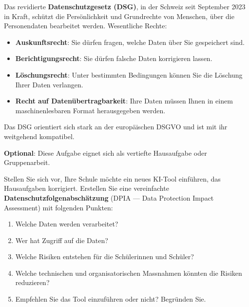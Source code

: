 \begin{myexcursion}
Das revidierte \textbf{Datenschutzgesetz (DSG)}, in der Schweiz seit September 2023
in Kraft, schützt die Persönlichkeit und Grundrechte von Menschen,
über die Personendaten bearbeitet werden. Wesentliche Rechte:

\begin{itemize}
    \item \textbf{Auskunftsrecht}: Sie dürfen fragen, welche Daten über Sie
          gespeichert sind.
    \item \textbf{Berichtigungsrecht}: Sie dürfen falsche Daten korrigieren lassen.
    \item \textbf{Löschungsrecht}: Unter bestimmten Bedingungen können Sie
          die Löschung Ihrer Daten verlangen.
    \item \textbf{Recht auf Datenübertragbarkeit}: Ihre Daten müssen Ihnen
          in einem maschinenlesbaren Format herausgegeben werden.
\end{itemize}

Das DSG orientiert sich stark an der europäischen DSGVO und ist mit ihr
weitgehend kompatibel.
\end{myexcursion}

\begin{mychallenge}[Datenschutzfolgenabschätzung]
\begin{myattention}
\textbf{Optional}: Diese Aufgabe eignet sich als vertiefte Hausaufgabe oder
Gruppenarbeit.
\end{myattention}

Stellen Sie sich vor, Ihre Schule möchte ein neues KI-Tool einführen, das
Hausaufgaben korrigiert. Erstellen Sie eine vereinfachte
\textbf{Datenschutzfolgenabschätzung} (DPIA --- Data Protection Impact Assessment)
mit folgenden Punkten:

\begin{enumerate}
    \item Welche Daten werden verarbeitet?
    \item Wer hat Zugriff auf die Daten?
    \item Welche Risiken entstehen für die Schülerinnen und Schüler?
    \item Welche technischen und organisatorischen Massnahmen könnten
          die Risiken reduzieren?
    \item Empfehlen Sie das Tool einzuführen oder nicht? Begründen Sie.
\end{enumerate}
\end{mychallenge}
